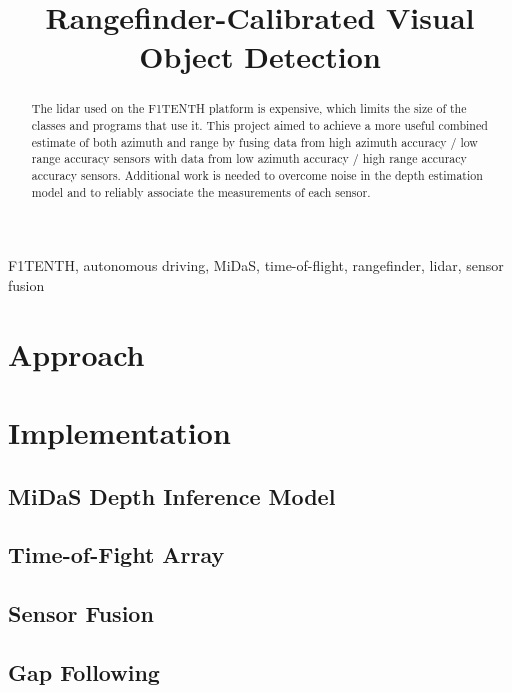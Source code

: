 \documentclass[conference]{IEEEtran}
\begin{document}
\title{Rangefinder-Calibrated Visual Object Detection}

\author{
\and
\and
\and
}

\maketitle

\begin{abstract}
The lidar used on the F1TENTH platform is expensive, which limits the size of
the classes and programs that use it. This project aimed to achieve a more
useful combined estimate of both azimuth and range by fusing data from high
azimuth accuracy / low range accuracy sensors with data from low azimuth
accuracy / high range accuracy accuracy sensors. Additional work is needed to
overcome noise in the depth estimation model and to reliably associate the
measurements of each sensor.
\end{abstract}

\begin{IEEEkeywords}
F1TENTH, autonomous driving, MiDaS, time-of-flight, rangefinder, lidar, sensor
fusion
\end{IEEEkeywords}

\section{Approach}

\section{Implementation}
\subsection{MiDaS Depth Inference Model}
\subsection{Time-of-Fight Array}
\subsection{Sensor Fusion}
\subsection{Gap Following}
\end{document}
